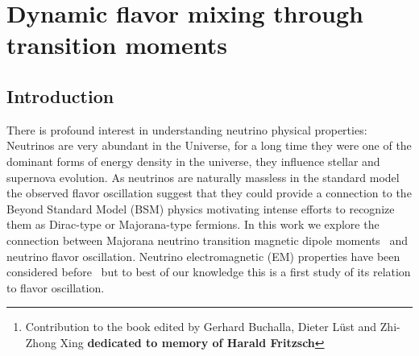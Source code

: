 \documentclass[addchapnum]{ws-rv961x669} %
\begin{document}
\chapter[Dynamic flavor mixing through transition moments]{\label{JR_ch1}Dynamic flavor mixing through transition moments}

\author[J. Rafelski, A. Steinmetz, and C. T. Yang]{Johann Rafelski, Andrew Steinmetz, and Cheng Tao Yang}

\address{Department of Physics, The University of Arizona, Tucson, AZ 85721, USA}

\begin{abstract} 
We show that Majorana neutrino flavor mixing can be driven by transition dipole moments in the presence of external electromagnetic fields. We demonstrate the  sensitivity of the rotation mixing matrix to strong electromagnetic fields obtaining neutrino eigenstates in the two-flavor model. We compare these results to well known neutrino-matter interactions, discuss three-flavor oscillations and note parallels to a response to unknown dark vector field vacuum fluctuations.\footnote{Contribution to the book edited by Gerhard Buchalla, Dieter L\"ust
and Zhi-Zhong Xing \textbf{dedicated to memory of Harald Fritzsch}}
\end{abstract}


\body


\section{Introduction}
\label{sec:intro}

There is profound interest in understanding neutrino  physical properties: Neutrinos are very abundant in the Universe, for a long time they were one of the dominant forms of energy density in the universe, they influence stellar and  supernova evolution. As neutrinos are naturally massless in the standard model the observed flavor oscillation suggest that they could provide a connection to the Beyond Standard Model (BSM) physics motivating  intense efforts to recognize them as Dirac-type or Majorana-type fermions. In this work we explore the connection between Majorana neutrino transition magnetic dipole moments~\cite{Fujikawa:1980yx,Shrock:1980vy,Shrock:1982sc} and neutrino flavor oscillation. Neutrino electromagnetic (EM) properties have been considered before~\cite{Schechter:1981hw,Giunti:2014ixa,Chukhnova:2019oum,Popov:2019nkr} but to best of our knowledge this is a first study of its relation to flavor oscillation.
\end{document}

